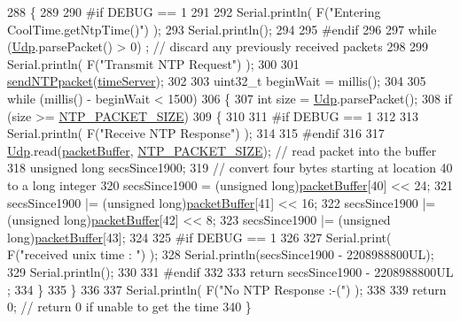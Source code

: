 \begin{DoxyCode}
288 \{
289 
290 \textcolor{preprocessor}{#if DEBUG == 1 }
291 
292     Serial.println( F(\textcolor{stringliteral}{"Entering CoolTime.getNtpTime()"}) );
293     Serial.println();
294 
295 \textcolor{preprocessor}{#endif }
296 
297     \textcolor{keywordflow}{while} (\hyperlink{class_cool_time_a4e23216a8121ca79d0fb019f30884b92}{Udp}.parsePacket() > 0) ; \textcolor{comment}{// discard any previously received packets}
298 
299     Serial.println( F(\textcolor{stringliteral}{"Transmit NTP Request"}) );
300 
301     \hyperlink{class_cool_time_a236a38d120dc53bc67456d763838c5a1}{sendNTPpacket}(\hyperlink{class_cool_time_ad2b9858f399108cb440dd1e908916f04}{timeServer});
302 
303     uint32\_t beginWait = millis();
304 
305     \textcolor{keywordflow}{while} (millis() - beginWait < 1500) 
306     \{
307         \textcolor{keywordtype}{int} size = \hyperlink{class_cool_time_a4e23216a8121ca79d0fb019f30884b92}{Udp}.parsePacket();
308         \textcolor{keywordflow}{if} (size >= \hyperlink{_cool_time_8h_a56a6ea64006651b4f42adf713e244f06}{NTP\_PACKET\_SIZE}) 
309         \{
310         
311 \textcolor{preprocessor}{        #if DEBUG == 1}
312 
313             Serial.println( F(\textcolor{stringliteral}{"Receive NTP Response"}) );
314         
315 \textcolor{preprocessor}{        #endif}
316 
317             \hyperlink{class_cool_time_a4e23216a8121ca79d0fb019f30884b92}{Udp}.read(\hyperlink{class_cool_time_a27e6abc82a5c2f72161956967005bec7}{packetBuffer}, \hyperlink{_cool_time_8h_a56a6ea64006651b4f42adf713e244f06}{NTP\_PACKET\_SIZE});  \textcolor{comment}{// read packet into the
       buffer}
318             \textcolor{keywordtype}{unsigned} \textcolor{keywordtype}{long} secsSince1900;
319             \textcolor{comment}{// convert four bytes starting at location 40 to a long integer}
320             secsSince1900 =  (\textcolor{keywordtype}{unsigned} long)\hyperlink{class_cool_time_a27e6abc82a5c2f72161956967005bec7}{packetBuffer}[40] << 24;
321             secsSince1900 |= (\textcolor{keywordtype}{unsigned} long)\hyperlink{class_cool_time_a27e6abc82a5c2f72161956967005bec7}{packetBuffer}[41] << 16;
322             secsSince1900 |= (\textcolor{keywordtype}{unsigned} long)\hyperlink{class_cool_time_a27e6abc82a5c2f72161956967005bec7}{packetBuffer}[42] << 8;
323             secsSince1900 |= (\textcolor{keywordtype}{unsigned} long)\hyperlink{class_cool_time_a27e6abc82a5c2f72161956967005bec7}{packetBuffer}[43];
324         
325 \textcolor{preprocessor}{        #if DEBUG == 1 }
326     
327             Serial.print( F(\textcolor{stringliteral}{"received unix time : "}) );
328             Serial.println(secsSince1900 - 2208988800UL);
329             Serial.println();
330 
331 \textcolor{preprocessor}{        #endif }
332 
333             \textcolor{keywordflow}{return} secsSince1900 - 2208988800UL ;
334         \}
335     \}
336     
337     Serial.println( F(\textcolor{stringliteral}{"No NTP Response :-("}) );
338 
339     \textcolor{keywordflow}{return} 0; \textcolor{comment}{// return 0 if unable to get the time}
340 \}
\end{DoxyCode}

